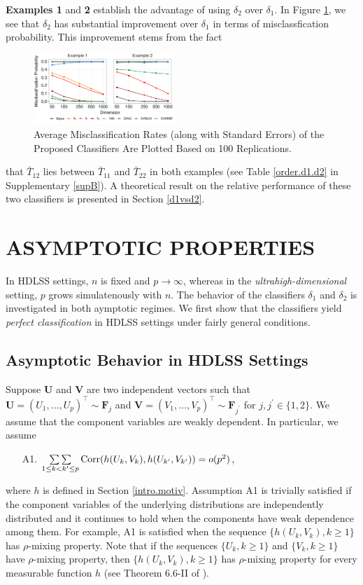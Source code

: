 \documentclass[twoside]{article}
\newcommand{\bF}{\mathbf{F}}
\newcommand{\bU}{\mathbf{U}}
\newcommand{\bV}{\mathbf{V}}
\newcommand{\0}{\mathbf{0}}
\newcommand{\1}{\mathbf{1}}
\numberwithin{equation}{section}
\begin{document}
{\bf Examples 1} and {\bf 2} establish the advantage of using $\delta_2$ over $\delta_1.$ In Figure \ref{plot1}, we see that $\delta_2$ has substantial improvement over $\delta_1$ in terms of misclassfication probability. This improvement stems from the fact
\begin{figure}[H]
  \centering
    \includegraphics[width = 0.475\textwidth, height = 0.235\textwidth]{section2_plot_split1-2.pdf}
 \caption{Average Misclassification Rates (along with Standard Errors) of the Proposed Classifiers Are Plotted Based on 100 Replications.}
  \label{plot1}
\end{figure}
that $\bar{T}_{12}$ lies between $\bar{T}_{11}$ and $\bar{T}_{22}$ in both examples (see Table \ref{order.d1.d2} in Supplementary \ref{supB}). A theoretical result on the relative performance of these two classifiers is presented in Section \ref{d1vsd2}.

\section{ASYMPTOTIC PROPERTIES}\label{asymptotics}
In HDLSS settings, $n$ is fixed and $p\to\infty$, whereas in the  \emph{ultrahigh-dimensional} setting, $p$ grows simulatenously with $n$. The behavior of the classifiers  $\delta_1$ and $\delta_2$ is investigated in both aymptotic regimes. We first show that the classifiers yield {\it perfect classification} in HDLSS settings under fairly general conditions.
\subsection{Asymptotic Behavior in HDLSS Settings}\label{asymp.HDLSS}
Suppose $\bU$ and $\bV$ are two independent vectors such that $\bU=(U_1,\ldots, U_p)^\top\sim \bF_j$ and $\bV=(V_1,\ldots, V_p)^\top\sim \bF_{j^\prime}$ for $j,j^\prime\in\{1,2\}$. We assume that the component variables are weakly dependent. In particular, we assume
\begin{enumerate}
 \item[A1.] $\mathop{\sum\sum}\limits_{1\leq k<k^\prime\leq p}{\rm Corr}(h(U_k,V_k), h(U_{k^\prime},V_{k^\prime}))=o(p^2)$,
\end{enumerate}
where $h$ is defined in Section \ref{intro.motiv}. Assumption A1 is trivially satisfied if the component variables of the underlying distributions are independently distributed and it continues to hold when the components have weak dependence among them. For example, A1 is satisfied when the sequence $\{h(U_k,V_k),k\geq 1\}$ has $\rho$-mixing property. Note that if the sequences $\{U_k,k\geq 1\}$ and $\{V_k,k\geq 1\}$ have $\rho$-mixing property, then $\{h(U_k,V_k),k\geq 1\}$ has $\rho$-mixing property for every measurable function $h$ (see Theorem 6.6-II of \cite{bradley2007introduction}).
\end{document}
